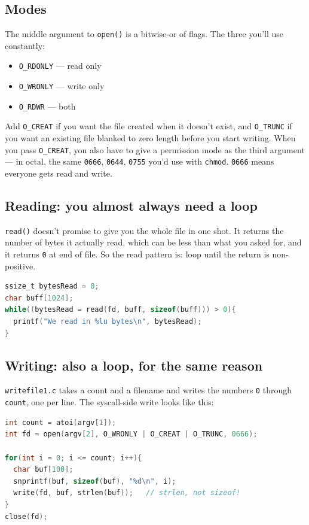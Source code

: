 \documentclass[11pt]{article}
\begin{document}
\subsection*{Modes}

The middle argument to \texttt{open()} is a bitwise-or of flags. The
three you'll use constantly:
\begin{itemize}
  \item \texttt{O\_RDONLY} --- read only
  \item \texttt{O\_WRONLY} --- write only
  \item \texttt{O\_RDWR} --- both
\end{itemize}
Add \texttt{O\_CREAT} if you want the file created when it doesn't
exist, and \texttt{O\_TRUNC} if you want an existing file blanked to
zero length before you start writing. When you pass \texttt{O\_CREAT},
you also have to give a permission mode as the third argument --- in
octal, the same \texttt{0666}, \texttt{0644}, \texttt{0755} you'd use
with \texttt{chmod}. \texttt{0666} means everyone gets read and write.

\subsection*{Reading: you almost always need a loop}

\texttt{read()} doesn't promise to give you the whole file in one
shot. It returns the number of bytes it actually read, which can be
less than what you asked for, and it returns \texttt{0} at end of
file. So the read pattern is: loop until the return is non-positive.

\begin{lstlisting}[language=C]
ssize_t bytesRead = 0;
char buff[1024];
while((bytesRead = read(fd, buff, sizeof(buff))) > 0){
  printf("We read in %lu bytes\n", bytesRead);
}
\end{lstlisting}

\subsection*{Writing: also a loop, for the same reason}

\texttt{writefile1.c} takes a count and a filename and writes the
numbers \texttt{0} through \texttt{count}, one per line. The
syscall-side write looks like this:

\begin{lstlisting}[language=C]
int count = atoi(argv[1]);
int fd = open(argv[2], O_WRONLY | O_CREAT | O_TRUNC, 0666);

for(int i = 0; i <= count; i++){
  char buf[100];
  snprintf(buf, sizeof(buf), "%d\n", i);
  write(fd, buf, strlen(buf));   // strlen, not sizeof!
}
close(fd);
\end{lstlisting}
\end{document}
